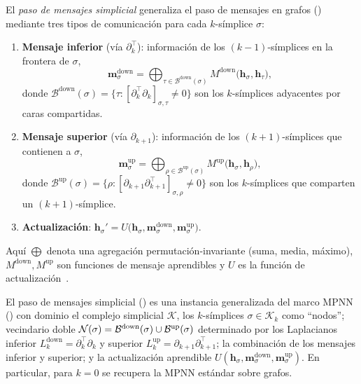 \begin{definition}
\label{def:priors:simplicial-mp}
El \emph{paso de mensajes simplicial} generaliza el paso de mensajes en grafos
() mediante tres tipos de comunicaci\'on para cada
$k$-s\'implice $\sigma$:
\begin{enumerate}
\item \textbf{Mensaje inferior} (v\'ia $\partial_k^{\!\top}$): informaci\'on de
los $(k{-}1)$-s\'implices en la frontera de $\sigma$,
\[
  \mathbf{m}_\sigma^{\mathrm{down}}
    = \bigoplus_{\tau \in \mathcal{B}^{\mathrm{down}}(\sigma)}
      M^{\mathrm{down}}\bigl(\mathbf{h}_\sigma, \mathbf{h}_\tau\bigr),
\]
donde $\mathcal{B}^{\mathrm{down}}(\sigma) =
\{\tau : [\partial_k^{\!\top} \partial_k]_{\sigma,\tau} \neq 0\}$ son los
$k$-s\'implices adyacentes por caras compartidas.
\item \textbf{Mensaje superior} (v\'ia $\partial_{k+1}$): informaci\'on de los
$(k{+}1)$-s\'implices que contienen a $\sigma$,
\[
  \mathbf{m}_\sigma^{\mathrm{up}}
    = \bigoplus_{\rho \in \mathcal{B}^{\mathrm{up}}(\sigma)}
      M^{\mathrm{up}}\bigl(\mathbf{h}_\sigma, \mathbf{h}_\rho\bigr),
\]
donde $\mathcal{B}^{\mathrm{up}}(\sigma) =
\{\rho : [\partial_{k+1} \partial_{k+1}^{\!\top}]_{\sigma,\rho} \neq 0\}$ son los
$k$-s\'implices que comparten un $(k{+}1)$-s\'implice.
\item \textbf{Actualizaci\'on}:
$\mathbf{h}_\sigma' = U\bigl(\mathbf{h}_\sigma,
\mathbf{m}_\sigma^{\mathrm{down}}, \mathbf{m}_\sigma^{\mathrm{up}}\bigr)$.
\end{enumerate}
Aqu\'i $\bigoplus$ denota una agregaci\'on permutaci\'on-invariante (suma, media,
m\'aximo), $M^{\mathrm{down}}, M^{\mathrm{up}}$ son funciones de mensaje
aprendibles y $U$ es la funci\'on de actualizaci\'on~\citep{bodnar2021weisfeiler}.
\end{definition}

\begin{proposition}
\label{prop:priors:tdl-mpnn}
El paso de mensajes simplicial () es una instancia
generalizada del marco MPNN () con dominio el complejo
simplicial $\mathcal{K}$, los $k$-s\'implices $\sigma \in \mathcal{K}_k$ como
``nodos''; vecindario doble
$\mathcal{N}(\sigma) = \mathcal{B}^{\mathrm{down}}(\sigma) \cup
\mathcal{B}^{\mathrm{up}}(\sigma)$ determinado por los Laplacianos inferior
$L_k^{\mathrm{down}} = \partial_k^{\!\top} \partial_k$ y superior
$L_k^{\mathrm{up}} = \partial_{k+1} \partial_{k+1}^{\!\top}$; la combinaci\'on de
los mensajes inferior y superior; y la actualizaci\'on aprendible
$U(\mathbf{h}_\sigma, \mathbf{m}_\sigma^{\mathrm{down}},
\mathbf{m}_\sigma^{\mathrm{up}})$. En particular, para $k = 0$ se recupera la MPNN
est\'andar sobre grafos.
\end{proposition}

